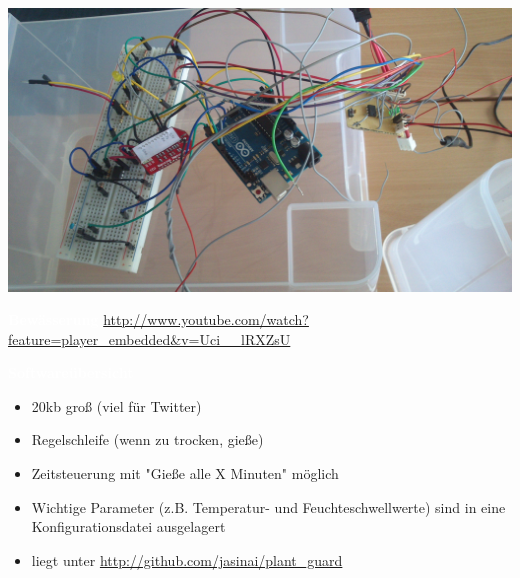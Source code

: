 \documentclass[bigger]{beamer}
\newcommand{\topic}[1]{{\huge{\textcolor{white}{\textbf{#1}}}}}
\begin{document}
\begin{frame}
\includegraphics[width=\linewidth]{hardware.jpg}
\end{frame}

\begin{frame}{\topic{Bewässerung}}
\url{http://www.youtube.com/watch?feature=player_embedded&v=Uci__lRXZsU}
\end{frame} 

\begin{frame}{\topic{Softwareübersicht}}
	\begin{itemize}
		\item 20kb groß (viel für Twitter)
		\item Regelschleife (wenn zu trocken, gieße)
		\item Zeitsteuerung mit "Gieße alle X Minuten" möglich
      \item Wichtige Parameter (z.B. Temperatur- und Feuchteschwellwerte) sind in eine Konfigurationsdatei ausgelagert
		\item liegt unter \url{http://github.com/jasinai/plant\_guard}
	\end{itemize}
\end{frame}
\end{document}
